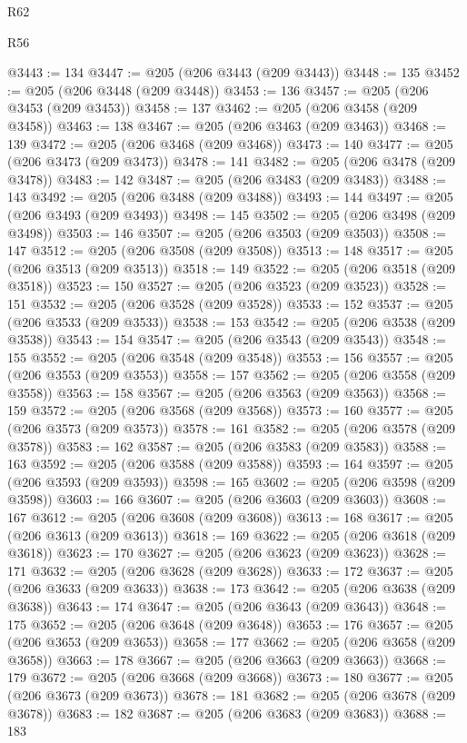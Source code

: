 \begin{lexlean}{R62}
\begin{lexlean}{R56}
\begin{coremodule}
{{{{{{{{{{{{{{{{{{{{{{{{{{{{{{{{{{{{{{{{{{{{{{{{{{{{{{{{{{{{{{{{{{{{{{{{{{{{{{{{{{{{{{{{{{{{{{{{{{{{{{{{{{{{{{{{{{{{{{{{{{{{{{{{{{{{{{{{{{{{{{{{{{{{{{{{{{{{{{{{{{{{{{{{{{{{{{{{{{{{{{{{{{{{{{{{{{{{{{{{{{{{{{{{{{{@3443 := 134
@3447 := @205 (@206 @3443 (@209 @3443))
@3448 := 135
@3452 := @205 (@206 @3448 (@209 @3448))
@3453 := 136
@3457 := @205 (@206 @3453 (@209 @3453))
@3458 := 137
@3462 := @205 (@206 @3458 (@209 @3458))
@3463 := 138
@3467 := @205 (@206 @3463 (@209 @3463))
@3468 := 139
@3472 := @205 (@206 @3468 (@209 @3468))
@3473 := 140
@3477 := @205 (@206 @3473 (@209 @3473))
@3478 := 141
@3482 := @205 (@206 @3478 (@209 @3478))
@3483 := 142
@3487 := @205 (@206 @3483 (@209 @3483))
@3488 := 143
@3492 := @205 (@206 @3488 (@209 @3488))
@3493 := 144
@3497 := @205 (@206 @3493 (@209 @3493))
@3498 := 145
@3502 := @205 (@206 @3498 (@209 @3498))
@3503 := 146
@3507 := @205 (@206 @3503 (@209 @3503))
@3508 := 147
@3512 := @205 (@206 @3508 (@209 @3508))
@3513 := 148
@3517 := @205 (@206 @3513 (@209 @3513))
@3518 := 149
@3522 := @205 (@206 @3518 (@209 @3518))
@3523 := 150
@3527 := @205 (@206 @3523 (@209 @3523))
@3528 := 151
@3532 := @205 (@206 @3528 (@209 @3528))
@3533 := 152
@3537 := @205 (@206 @3533 (@209 @3533))
@3538 := 153
@3542 := @205 (@206 @3538 (@209 @3538))
@3543 := 154
@3547 := @205 (@206 @3543 (@209 @3543))
@3548 := 155
@3552 := @205 (@206 @3548 (@209 @3548))
@3553 := 156
@3557 := @205 (@206 @3553 (@209 @3553))
@3558 := 157
@3562 := @205 (@206 @3558 (@209 @3558))
@3563 := 158
@3567 := @205 (@206 @3563 (@209 @3563))
@3568 := 159
@3572 := @205 (@206 @3568 (@209 @3568))
@3573 := 160
@3577 := @205 (@206 @3573 (@209 @3573))
@3578 := 161
@3582 := @205 (@206 @3578 (@209 @3578))
@3583 := 162
@3587 := @205 (@206 @3583 (@209 @3583))
@3588 := 163
@3592 := @205 (@206 @3588 (@209 @3588))
@3593 := 164
@3597 := @205 (@206 @3593 (@209 @3593))
@3598 := 165
@3602 := @205 (@206 @3598 (@209 @3598))
@3603 := 166
@3607 := @205 (@206 @3603 (@209 @3603))
@3608 := 167
@3612 := @205 (@206 @3608 (@209 @3608))
@3613 := 168
@3617 := @205 (@206 @3613 (@209 @3613))
@3618 := 169
@3622 := @205 (@206 @3618 (@209 @3618))
@3623 := 170
@3627 := @205 (@206 @3623 (@209 @3623))
@3628 := 171
@3632 := @205 (@206 @3628 (@209 @3628))
@3633 := 172
@3637 := @205 (@206 @3633 (@209 @3633))
@3638 := 173
@3642 := @205 (@206 @3638 (@209 @3638))
@3643 := 174
@3647 := @205 (@206 @3643 (@209 @3643))
@3648 := 175
@3652 := @205 (@206 @3648 (@209 @3648))
@3653 := 176
@3657 := @205 (@206 @3653 (@209 @3653))
@3658 := 177
@3662 := @205 (@206 @3658 (@209 @3658))
@3663 := 178
@3667 := @205 (@206 @3663 (@209 @3663))
@3668 := 179
@3672 := @205 (@206 @3668 (@209 @3668))
@3673 := 180
@3677 := @205 (@206 @3673 (@209 @3673))
@3678 := 181
@3682 := @205 (@206 @3678 (@209 @3678))
@3683 := 182
@3687 := @205 (@206 @3683 (@209 @3683))
@3688 := 183
}}}}}}}}}}}}}}}}}}}}}}}}}}}}}}}}}}}}}}}}}}}}}}}}}}}}}}}}}}}}}}}}}}}}}}}}}}}}}}}}}}}}}}}}}}}}}}}}}}}}}}}}}}}}}}}}}}}}}}}}}}}}}}}}}}}}}}}}}}}}}}}}}}}}}}}}}}}}}}}}}}}}}}}}}}}}}}}}}}}}}}}}}}}}}}}}}}}}}}}}}}}}}}}}}}}
\end{coremodule}
\end{lexlean}
\end{lexlean}
